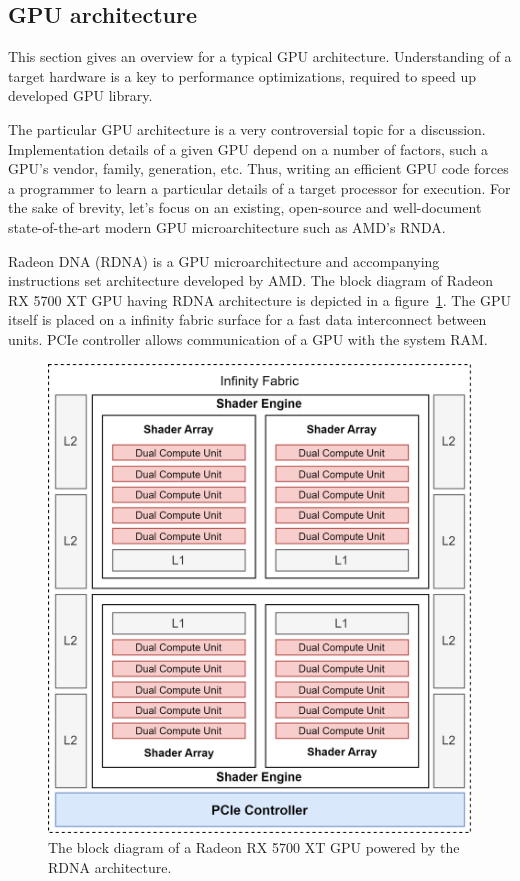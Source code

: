 \subsection{GPU architecture}

This section gives an overview for a typical GPU architecture. Understanding of a target hardware is a key to performance optimizations, required to speed up developed GPU library.

The particular GPU architecture is a very controversial topic for a discussion. Implementation details of a given GPU depend on a number of factors, such a GPU's vendor, family, generation, etc. Thus, writing an efficient GPU code forces a programmer to learn a particular details of a target processor for execution. For the sake of brevity, let's focus on an existing, open-source and well-document state-of-the-art modern GPU microarchitecture such as AMD's RNDA.

Radeon DNA (RDNA) is a GPU microarchitecture and accompanying instructions set architecture developed by AMD. The block diagram of Radeon RX 5700 XT GPU having RDNA architecture is depicted in a figure~\ref{fig:rdna_gpu}. The GPU itself is placed on a infinity fabric surface for a fast data interconnect between units. PCIe controller allows communication of a GPU with the system RAM. 

\begin{figure}
    \centering
    \includegraphics[width=1.0\textwidth]{images/rdna_gpu.png}
    \caption{The block diagram of a Radeon RX 5700 XT GPU powered by the RDNA architecture.}
    \label{fig:rdna_gpu}
\end{figure}

